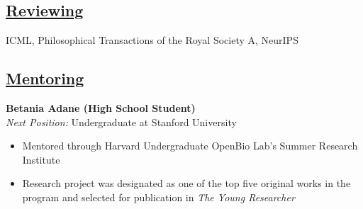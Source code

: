 \documentclass[11pt,a4paper]{article}
\begin{document}
\subsection{\underline{Reviewing}}
ICML, Philosophical Transactions of the Royal Society A, NeurIPS

\subsection{\underline{Mentoring}}
\textbf{Betania Adane (High School Student)} \\
\textit{Next Position:} Undergraduate at Stanford University
\begin{itemize}
    \item Mentored through Harvard Undergraduate OpenBio Lab's Summer Research Institute
    \item Research project was designated as one of the top five original works in the program and selected for publication in \textit{The Young Researcher}
\end{itemize}
\end{document}
